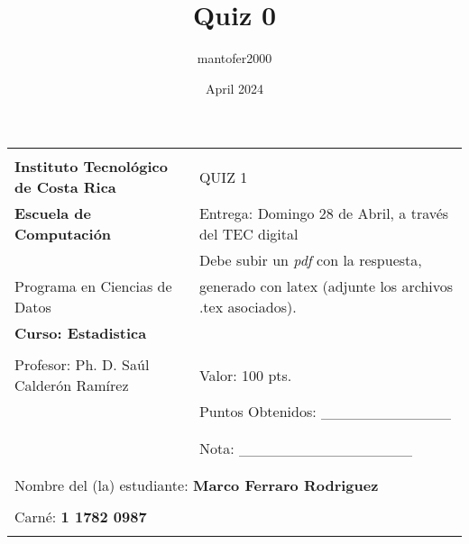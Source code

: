 \documentclass{article}
\title{Quiz 0}
\author{mantofer2000 }
\date{April 2024}
\begin{document}
\begin{flushleft}
\begin{tabular}{|l|l|}
\hline 
 & \tabularnewline
\textbf{\large{}Instituto Tecnológico de Costa Rica} & QUIZ 1\tabularnewline
\textbf{\large{}Escuela de Computación} & Entrega: Domingo 28 de Abril, a través del TEC digital\tabularnewline
 & Debe subir un \emph{pdf }con la respuesta,\tabularnewline
Programa en Ciencias de Datos & generado con latex (adjunte los archivos .tex asociados).\tabularnewline
\textbf{Curso: Estadistica} & \tabularnewline
 & \tabularnewline
Profesor: Ph. D. Saúl Calderón Ramírez & Valor: 100 pts.\tabularnewline
 & Puntos Obtenidos: \_\_\_\_\_\_\_\_\_\_\_\_\tabularnewline
 & \tabularnewline
 & \tabularnewline
 & Nota: \_\_\_\_\_\_\_\_\_\_\_\_\_\_\_\_\tabularnewline
 & \tabularnewline
\cline{2-2} 
\multicolumn{2}{|c|}{}\tabularnewline
\multicolumn{2}{|l|}{Nombre del (la) estudiante:\textbf{ Marco Ferraro Rodriguez}}\tabularnewline
\multicolumn{1}{|l}{} & \tabularnewline
\multicolumn{1}{|l}{Carné: \textbf{1 1782 0987}} & \tabularnewline
\multicolumn{1}{|l}{} & \tabularnewline
\hline 
\end{tabular}
\par\end{flushleft}
\end{document}
